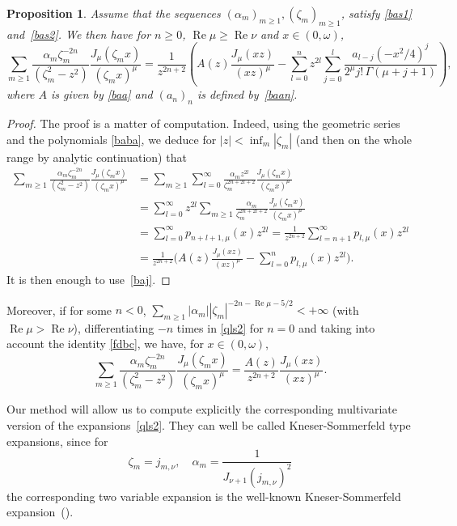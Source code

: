 \documentclass[12pt,leqno]{amsart}
\numberwithin{equation}{section}
\theoremstyle{plain}
\newtheorem{proposition}[theorem]{Proposition}
\renewcommand{\Re}{\operatorname{Re}}
\begin{document}
\begin{proposition}
\label{qls} 
Assume that the sequences $(\alpha_m)_{m\ge 1}, (\zeta_m)_{m\ge 1}$, satisfy \eqref{bas1} and~\eqref{bas2}. We then have for $n\ge 0$, $\Re \mu\ge \Re \nu$ and $x\in (0,\omega)$,
\begin{equation}
\label{qls2}
\sum_{m\ge 1} \frac{\alpha_m\zeta_m^{-2n}}{(\zeta_m^2-z^2)}
\frac{J_{\mu}(\zeta_m x)}{(\zeta_m x)^\mu}
= \frac{1}{z^{2n+2}} \left(A(z)\frac{J_{\mu}(xz)}{(xz)^\mu} - \sum_{l=0}^nz^{2l} \sum_{j=0}^l
\frac{a_{l-j}(-x^2/4)^{j}}{2^{\mu}j!\,\Gamma(\mu+j+1)}\right),
\end{equation}
where $A$ is given by \eqref{baa} and $(a_n)_n$ is defined by~\eqref{baan}.
\end{proposition}

\begin{proof}
The proof is a matter of computation. Indeed, using the geometric series and the polynomials \eqref{baba}, we deduce for $|z| < \inf_m |\zeta_m|$ (and then on the whole range by analytic continuation) that
\begin{align*}
\sum_{m\ge 1}\frac{\alpha_m\zeta_m^{-2n}}{(\zeta_m^2-z^2)} \frac{J_{\mu}(\zeta_m x)}{(\zeta_m x)^\mu} 
 &= \sum_{m\ge 1} \sum_{l=0}^\infty \frac{\alpha_m z^{2l}}{\zeta_m^{2n+2l+2}} 
 \frac{J_{\mu}(\zeta_m x)}{(\zeta_m x)^\mu} \\
 &= \sum_{l=0}^\infty z^{2l} \sum_{m\ge 1} \frac{\alpha_m}{\zeta_m^{2n+2l+2}} \frac{J_{\mu}(\zeta_m x)}{(\zeta_m x)^\mu} \\
 &= \sum_{l=0}^\infty p_{n+l+1,\mu}(x)z^{2l}
 = \frac{1}{z^{2n+2}} \sum_{l=n+1}^\infty p_{l,\mu}(x)z^{2l} \\
 &= \frac{1}{z^{2n+2}} \bigg(A(z)\frac{J_{\mu}(xz)}{(xz)^\mu} - \sum_{l=0}^np_{l,\mu}(x)z^{2l} \bigg).
\end{align*}
It is then enough to use~\eqref{baj}.
\end{proof}

Moreover, if for some $n<0$, $ \sum_{m\ge 1} |\alpha_m| |\zeta_m|^{-2n-\Re \mu -5/2} < +\infty$ (with $\Re \mu>\Re \nu$), differentiating $-n$ times in \eqref{qls2} for $n=0$ and taking into account the identity \eqref{fdbc}, we have, for $x\in (0,\omega)$,
\begin{equation*}
\sum_{m\ge 1} \frac{\alpha_m\zeta_m^{-2n}}{(\zeta_m^2-z^2)}
\frac{J_{\mu}(\zeta_m x)}{(\zeta_m x)^\mu}
= \frac{A(z)}{z^{2n+2}} \frac{J_{\mu}(xz)}{(xz)^\mu}.
\end{equation*}

Our method will allow us to compute explicitly the corresponding multivariate version of the expansions~\eqref{qls2}. They can well be called Kneser-Sommerfeld type expansions, since for
\[
\zeta_m = j_{m,\nu},\quad \alpha_m = \frac{1}{J_{\nu+1}(j_{m,\nu})^2}
\]
the corresponding two variable expansion is the well-known Kneser-Sommerfeld expansion~(\cite{Mar}).
\end{document}
